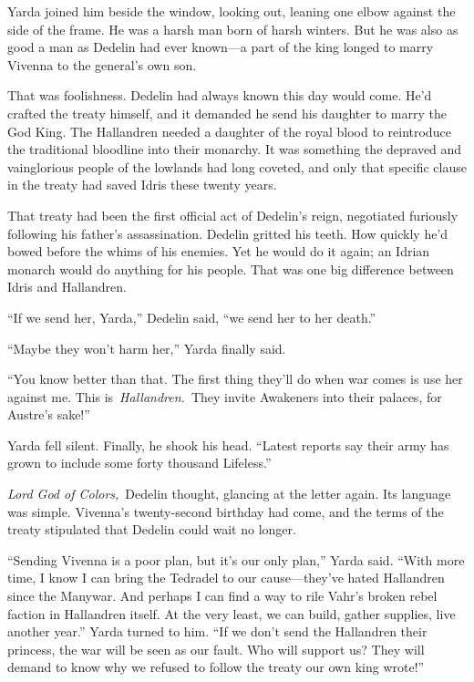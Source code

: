 Yarda joined him beside the window, looking out, leaning one elbow against the side of the frame. He was a harsh man born of harsh winters. But he was also as good a man as Dedelin had ever known—a part of the king longed to marry Vivenna to the general’s own son.

That was foolishness. Dedelin had always known this day would come. He’d crafted the treaty himself, and it demanded he send his daughter to marry the God King. The Hallandren needed a daughter of the royal blood to reintroduce the traditional bloodline into their monarchy. It was something the depraved and vainglorious people of the lowlands had long coveted, and only that specific clause in the treaty had saved Idris these twenty years.

That treaty had been the first official act of Dedelin’s reign, negotiated furiously following his father’s assassination. Dedelin gritted his teeth. How quickly he’d bowed before the whims of his enemies. Yet he would do it again; an Idrian monarch would do anything for his people. That was one big difference between Idris and Hallandren.

“If we send her, Yarda,” Dedelin said, “we send her to her death.”

“Maybe they won’t harm her,” Yarda finally said.

“You know better than that. The first thing they’ll do when war comes is use her against me. This is~\textit{Hallandren.}~They invite Awakeners into their palaces, for Austre’s sake!”

Yarda fell silent. Finally, he shook his head. “Latest reports say their army has grown to include some forty thousand Lifeless.”

\textit{Lord God of Colors,}~Dedelin thought, glancing at the letter again. Its language was simple. Vivenna’s twenty-second birthday had come, and the terms of the treaty stipulated that Dedelin could wait no longer.

“Sending Vivenna is a poor plan, but it’s our only plan,” Yarda said. “With more time, I know I can bring the Tedradel to our cause—they’ve hated Hallandren since the Manywar. And perhaps I can find a way to rile Vahr’s broken rebel faction in Hallandren itself. At the very least, we can build, gather supplies, live another year.” Yarda turned to him. “If we don’t send the Hallandren their princess, the war will be seen as our fault. Who will support us? They will demand to know why we refused to follow the treaty our own king wrote!”

